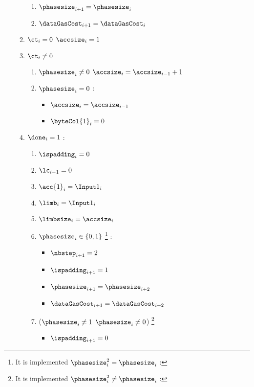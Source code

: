 \begin{enumerate}[resume]
\begin{enumerate}
\begin{enumerate}
                \item $\phasesize_{i + 1} = \phasesize_{i}$
                \item $\dataGasCost_{i + 1} = \dataGasCost_{i}$
            \end{enumerate}
            \item \If $\ct_{i}=0$ \Then $\accsize_{i}= 1$
            \item \If $\ct_{i} \neq 0$ \Then
            \begin{enumerate}
                \item \If $\phasesize_{i} \neq 0$ \Then $\accsize_{i}=\accsize_{i-1}+1$
                \item \If $\phasesize_{i}=0$ \Then:
                \begin{itemize}
                    \item $\accsize_{i}=\accsize_{i-1}$
                    \item $\byteCol{1}_{i}=0$
                \end{itemize}
            \end{enumerate}
            \item \If $\done_{i}=1$ \Then:
            \begin{enumerate}
                \item $\ispadding_{i}=0$
                \item $\lc_{i-1}=0$
                \item $\acc{1}_{i} = \Input1_{i}$
                \item $\limb_{i} = \Input1_{i}$
                \item $\limbsize_{i}=\accsize_{i}$
                \item \If $\phasesize_{i} \in \{0, 1\}$ \footnote{It is implemented \If $\phasesize_{i}^{2} = \phasesize_{i}$ \Then:} \Then:
                \begin{itemize}
                    \item $\nbstep_{i+1}=2$
                    \item  $\ispadding_{i+1} = 1$
                    \item $\phasesize_{i + 1} = \phasesize_{i+2}$
                    \item $\dataGasCost_{i + 1} = \dataGasCost_{i+2}$
                \end{itemize}
                \item \If ($\phasesize_{i} \neq 1$ \et $\phasesize_{i} \neq 0$) \footnote{It is implemented \If $\phasesize_{i}^{2} \neq \phasesize_{i}$ \Then:} \Then 
                \begin{itemize}
                    \item $\ispadding_{i+1} = 0$
                \end{itemize}
            \end{enumerate}
        \end{enumerate}        
\end{enumerate}
